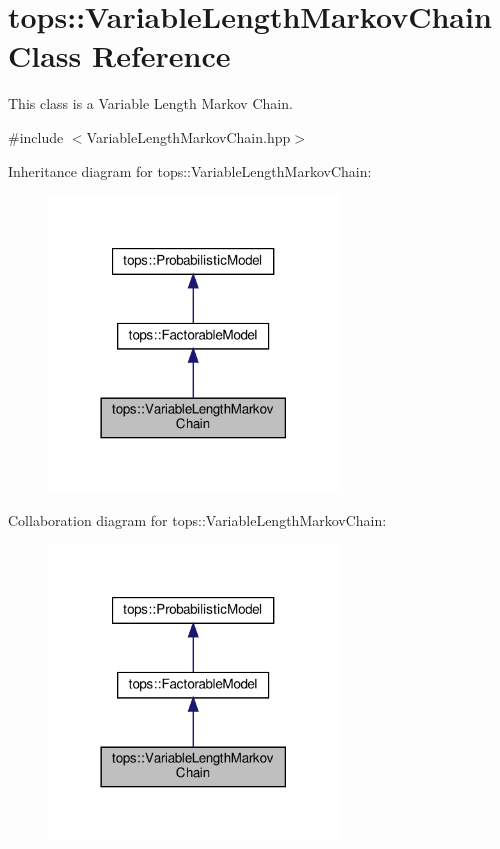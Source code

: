 \hypertarget{classtops_1_1VariableLengthMarkovChain}{}\section{tops\+:\+:Variable\+Length\+Markov\+Chain Class Reference}
\label{classtops_1_1VariableLengthMarkovChain}


This class is a Variable Length Markov Chain.  




{\ttfamily \#include $<$Variable\+Length\+Markov\+Chain.\+hpp$>$}



Inheritance diagram for tops\+:\+:Variable\+Length\+Markov\+Chain\+:
\nopagebreak
\begin{figure}[H]
\begin{center}
\leavevmode
\includegraphics[width=218pt]{classtops_1_1VariableLengthMarkovChain__inherit__graph}
\end{center}
\end{figure}


Collaboration diagram for tops\+:\+:Variable\+Length\+Markov\+Chain\+:
\nopagebreak
\begin{figure}[H]
\begin{center}
\leavevmode
\includegraphics[width=218pt]{classtops_1_1VariableLengthMarkovChain__coll__graph}
\end{center}
\end{figure}
